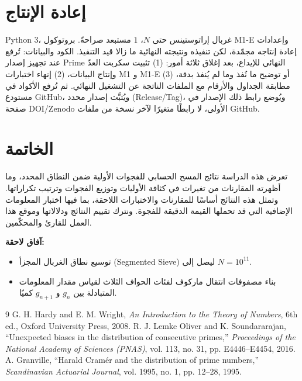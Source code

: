 \documentclass[12pt,a4paper]{article}
\begin{document}
\section{إعادة الإنتاج}
\textenglish{Python 3}، غربال إراتوستينس حتى $N$، $1$ مستبعد صراحةً. بروتوكول \textenglish{M1-E} وإعدادات إعادة إنتاجه مجمّدة، لكن تنفيذه ونتيجته النهائية ما زالا قيد التنفيذ. الكود والبيانات: تُرفع عند تجهيز إصدار Prime النهائي للإيداع، بعد إغلاق ثلاثة أمور: (1) تثبيت سكربت العدّ وإنتاج البيانات، (2) إنهاء اختبارات M1 و M1-E أو توضيح ما نُفذ وما لم يُنفذ بدقة، (3) مطابقة الجداول والأرقام مع الملفات الناتجة عن التشغيل النهائي. ثم تُرفع الأكواد في مستودع \textenglish{GitHub}، ويُثبَّت إصدار محدد (\textenglish{Release/Tag})، ويُوضع رابط ذلك الإصدار في صفحة \textenglish{DOI/Zenodo} الأولى، لا رابطًا متغيرًا لآخر نسخة من ملفات \textenglish{GitHub}.

\section{الخاتمة}
تعرض هذه الدراسة نتائج المسح الحسابي للفجوات الأولية ضمن النطاق المحدد، وما أظهرته المقارنات من تغيرات في كثافة الأوليات وتوزيع الفجوات وترتيب تكراراتها. وتمثل هذه النتائج أساسًا للمقارنات والاختبارات اللاحقة، بما فيها اختبار المعلومات الإضافية التي قد تحملها القيمة الدقيقة للفجوة. ونترك تقييم النتائج ودلالاتها وموقع هذا العمل للقارئ والمحكّمين.

\textbf{آفاق لاحقة:}
\begin{itemize}
\item توسيع نطاق الغربال المجزأ (\textenglish{Segmented Sieve}) ليصل إلى $N = 10^{11}$.
\item بناء مصفوفات انتقال ماركوف لفئات الحواف الثلاث لقياس مقدار المعلومات المتبادلة بين $g_n$ و $g_{n+1}$ كميًا.
\end{itemize}

\begin{thebibliography}{9}
G. H. Hardy and E. M. Wright, \textit{An Introduction to the Theory of Numbers}, 6th ed., Oxford University Press, 2008.
R. J. Lemke Oliver and K. Soundararajan, ``Unexpected biases in the distribution of consecutive primes,'' \textit{Proceedings of the National Academy of Sciences (PNAS)}, vol. 113, no. 31, pp. E4446--E4454, 2016.
A. Granville, ``Harald Cramér and the distribution of prime numbers,'' \textit{Scandinavian Actuarial Journal}, vol. 1995, no. 1, pp. 12--28, 1995.
\end{thebibliography}
\end{document}

